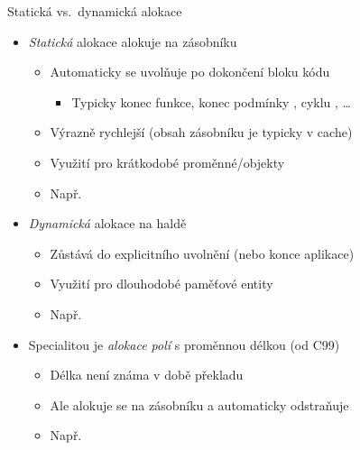 \begin{frame}{Statická vs.\ dynamická alokace}

  \begin{itemize}
    \item \emph{Statická} alokace alokuje na zásobníku
    \begin{itemize}
      \item Automaticky se uvolňuje po dokončení bloku kódu
      \begin{itemize}
	\item Typicky konec funkce, konec podmínky , cyklu ,
	  \dots
      \end{itemize}

      \pause

      \item Výrazně rychlejší (obsah zásobníku je typicky v cache)
      \item Využití pro krátkodobé proměnné/objekty

      \pause

      \item Např.\ 
    \end{itemize}

    \pause

    \item \emph{Dynamická} alokace na haldě
    \begin{itemize}
      \item Zůstává do explicitního uvolnění (nebo konce aplikace)
      \item Využití pro dlouhodobé paměťové entity

      \pause

      \item Např.\ 
    \end{itemize}

    \pause

    \item Specialitou je \emph{alokace polí} s proměnnou délkou (od C99)
    \begin{itemize}
      \item Délka není známa v době překladu
      \item Ale alokuje se na zásobníku a automaticky odstraňuje

      \pause

      \item Např.\ 
    \end{itemize}
  \end{itemize}

\end{frame}


